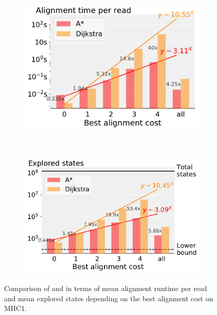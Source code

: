 \begin{figure}[t]
  \begin{subfigure}{.45\textwidth}
    \centering
    \includegraphics[width=\linewidth]{figs/cmp/heuristic_MHC1_cost-t(map).pdf}
  \end{subfigure}~\hspace{1em}
  \begin{subfigure}{.49\textwidth}
    \centering
    \includegraphics[width=\linewidth]{figs/cmp/heuristic_MHC1_cost-explored_states.pdf}
  \end{subfigure}%
  \caption{Comparison of \A and \dijkstra in terms of mean alignment runtime per read and mean explored states depending on the best alignment cost on MHC1.}
  \label{TRIEfig:scaling_with_errors}
\end{figure}